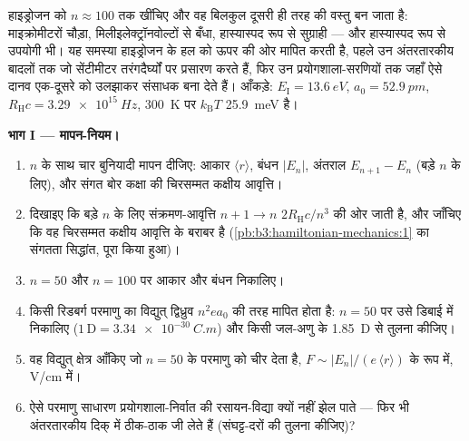 \begin{problem}\label{pb:b3:hydrogen-atom:1}
हाइड्रोजन को $n \approx 100$ तक खींचिए और वह बिलकुल दूसरी ही तरह की
वस्तु बन जाता है: माइक्रोमीटरों चौड़ा, मिलीइलेक्ट्रॉनवोल्टों से बँधा,
हास्यास्पद रूप से सुग्राही --- और हास्यास्पद रूप से उपयोगी भी। यह
समस्या हाइड्रोजन के हल को ऊपर की ओर मापित करती है, पहले उन अंतरतारकीय
बादलों तक जो सेंटीमीटर तरंगदैर्घ्यों पर प्रसारण करते हैं, फिर उन
प्रयोगशाला-सरणियों तक जहाँ ऐसे दानव एक-दूसरे को उलझाकर संसाधक बना देते
हैं। आँकड़े:
$E_{\text{I}} = \qty{13.6}{eV}$, $a_0 = \qty{52.9}{pm}$,
$R_{\text{H}}c = \qty{3.29e15}{Hz}$, \qty{300}{K} पर
$k_{\text{B}}T$ \qty{25.9}{meV} है।

\medskip\noindent\textbf{भाग I --- मापन-नियम।}
\begin{enumerate}
  \item $n$ के साथ चार बुनियादी मापन दीजिए: आकार $\langle
        r\rangle$, बंधन $|E_n|$, अंतराल $E_{n+1} - E_n$ (बड़े $n$
        के लिए), और संगत बोर कक्षा की चिरसम्मत कक्षीय आवृत्ति।
  \item दिखाइए कि बड़े $n$ के लिए संक्रमण-आवृत्ति $n+1 \to
        n$ $2R_{\text{H}}c/n^3$ की ओर जाती है, और जाँचिए कि वह
        चिरसम्मत कक्षीय आवृत्ति के बराबर है
        (\cref{pb:b3:hamiltonian-mechanics:1} का संगतता
        सिद्धांत, पूरा किया हुआ)।
  \item $n = 50$ और $n = 100$ पर आकार और बंधन निकालिए।
  \item किसी रिडबर्ग परमाणु का विद्युत् द्विध्रुव $n^2ea_0$ की तरह
        मापित होता है: $n = 50$ पर उसे डिबाई में निकालिए
        ($1\,\text{D} =
        \qty{3.34e-30}{C.m}$) और किसी जल-अणु के
        \qty{1.85}{D} से तुलना कीजिए।
  \item वह विद्युत् क्षेत्र आँकिए जो $n = 50$ के परमाणु को चीर देता
        है, $F \sim |E_n|/(e\,\langle r\rangle)$ के रूप में, V/cm में।
  \item ऐसे परमाणु साधारण प्रयोगशाला-निर्वात की रसायन-विद्या क्यों
        नहीं झेल पाते --- फिर भी अंतरतारकीय दिक् में ठीक-ठाक जी लेते
        हैं (संघट्ट-दरों की तुलना कीजिए)?
\end{enumerate}


\end{problem}
